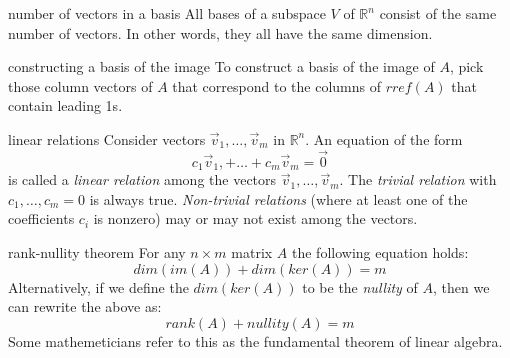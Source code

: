 \documentclass[avery5371,grid,letterpaper]{flashcards}
\newcommand{\Rn}{\mathbb{R}^{n}}
\newcommand{\nbym}{n\times m}
\begin{document}
\begin{flashcard}[Theorem]{number of vectors in a basis}
All bases of a subspace $V$ of $\Rn$ consist of the same number of
vectors.  In other words, they all have the same dimension.
\end{flashcard}

\begin{flashcard}[Algorithm]{constructing a basis of the image}
To construct a basis of the image of $A$, pick those column vectors of
$A$ that correspond to the columns of $rref(A)$ that contain leading 1s.
\end{flashcard}

\begin{flashcard}[Definition]{linear relations}
Consider vectors $\vec{v}_1, \ldots, \vec{v}_m$ in $\Rn$.  An equation
of the form
\begin{displaymath}
c_1 \vec{v}_1, + \ldots + c_m \vec{v}_m = \vec{0}
\end{displaymath}
is called a \textit{linear relation} among the vectors
$\vec{v}_1, \ldots, \vec{v}_m$.  The \textit{trivial relation} with
$c_1, \ldots ,c_m = 0$ is always true.  \textit{Non-trivial relations}
(where at least one of the coefficients $c_i$ is nonzero) may or may not
exist among the vectors.
\end{flashcard}

\begin{flashcard}[Theorem]{rank-nullity theorem}
For any $\nbym$ matrix $A$ the following equation holds:
\begin{displaymath}
dim(im(A)) + dim(ker(A)) = m
\end{displaymath}
Alternatively, if we define the $dim(ker(A))$ to be the \textit{nullity}
of $A$, then we can rewrite the above as:
\begin{displaymath}
rank(A) + nullity(A) = m
\end{displaymath}
Some mathemeticians refer to this as the fundamental theorem of linear algebra.
\end{flashcard}
\end{document}
